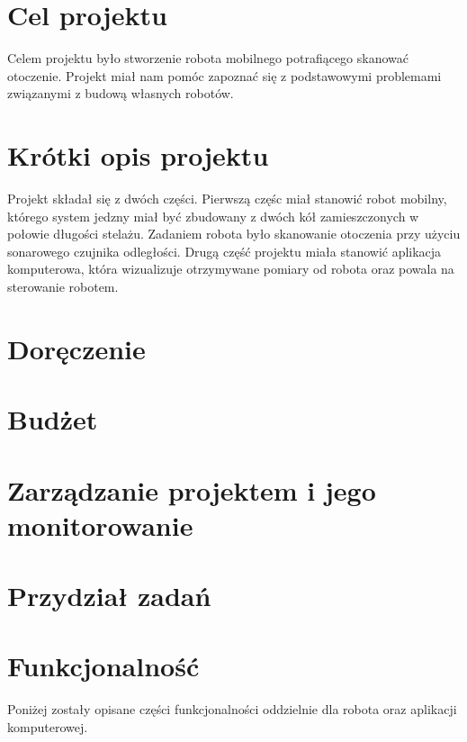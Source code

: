 \documentclass[a4paper]{article}
\begin{document}

\newpage

\tableofcontents
\listoffigures

\newpage

\section{Cel projektu}
Celem projektu było stworzenie robota mobilnego potrafiącego skanować otoczenie. Projekt miał nam pomóc zapoznać się z podstawowymi problemami związanymi z budową własnych robotów. 

\section{Krótki opis projektu}
Projekt składał się z dwóch części. Pierwszą częśc miał stanowić robot mobilny, którego system jedzny miał być zbudowany z dwóch kół zamieszczonych w połowie długości stelażu. Zadaniem robota było skanowanie otoczenia przy użyciu sonarowego czujnika odległości. \newline
Drugą część projektu miała stanowić aplikacja komputerowa, która wizualizuje otrzymywane pomiary od robota oraz powala na sterowanie robotem. 

\section{Doręczenie}


\section{Budżet}


\section{Zarządzanie projektem i jego monitorowanie}


\section{Przydział zadań}


\section{Funkcjonalność}
Poniżej zostały opisane części funkcjonalności oddzielnie dla robota oraz aplikacji komputerowej.
\end{document}
